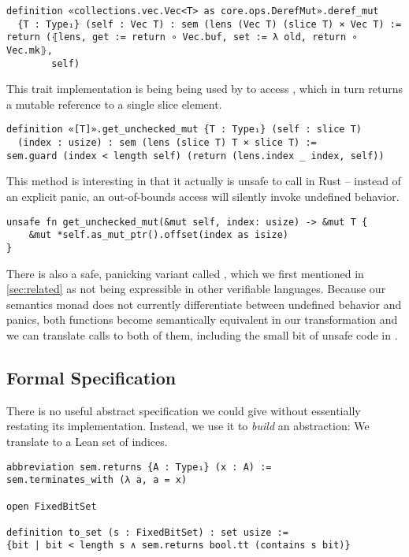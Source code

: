 \begin{verbatim}
definition «collections.vec.Vec<T> as core.ops.DerefMut».deref_mut
  {T : Type₁} (self : Vec T) : sem (lens (Vec T) (slice T) × Vec T) :=
return (⦃lens, get := return ∘ Vec.buf, set := λ old, return ∘ Vec.mk⦄,
        self)
\end{verbatim}

This trait implementation is being being used by  to
access , which in turn returns a mutable reference
to a single slice element.

\begin{verbatim}
definition «[T]».get_unchecked_mut {T : Type₁} (self : slice T)
  (index : usize) : sem (lens (slice T) T × slice T) :=
sem.guard (index < length self) (return (lens.index _ index, self))
\end{verbatim}

This method is interesting in that it actually is unsafe to call in Rust --
instead of an explicit panic, an out-of-bounds access will silently invoke
undefined behavior.

\begin{verbatim}
unsafe fn get_unchecked_mut(&mut self, index: usize) -> &mut T {
    &mut *self.as_mut_ptr().offset(index as isize)
}
\end{verbatim}

There is also a safe, panicking variant called , which we
first mentioned in \autoref{sec:related} as not being expressible in other
verifiable languages. Because our semantics monad does not currently differentiate between
undefined behavior and panics, both functions become semantically equivalent in
our transformation and we can translate calls to both of them, including the
small bit of unsafe code in .

\subsection{Formal Specification}

There is no useful abstract specification we could give  without
essentially restating its implementation. Instead, we use it to \emph{build} an
abstraction: We translate  to a Lean set of indices.

\begin{verbatim}
abbreviation sem.returns {A : Type₁} (x : A) :=
sem.terminates_with (λ a, a = x)

open FixedBitSet

definition to_set (s : FixedBitSet) : set usize :=
{bit | bit < length s ∧ sem.returns bool.tt (contains s bit)}
\end{verbatim}

